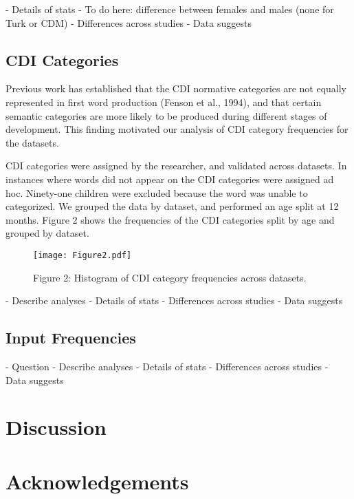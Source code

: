 \documentclass[10pt,letterpaper]{article}
\begin{document}
- Details of stats
- To do here: difference between females and males (none for Turk or CDM)
- Differences across studies
- Data suggests

\subsection{CDI Categories} 
Previous work has established that the CDI normative categories are not equally represented in first word production (Fenson et al., 1994), and that certain semantic categories are more likely to be produced during different stages of development. This finding motivated our analysis of CDI category frequencies for the datasets.\par
CDI categories were assigned by the researcher, and validated across datasets. In instances where words did not appear on the CDI categories were assigned ad hoc. Ninety-one children were excluded because the word was unable to categorized. We grouped the data by dataset, and performed an age split at 12 months. Figure 2 shows the frequencies of the CDI categories split by age and grouped by dataset.

\begin{figure}[t]
\begin{center}
\texttt{[image: Figure2.pdf]}
\end{center}
\caption{Figure 2: Histogram of CDI category frequencies across datasets.}
\end{figure}

- Describe analyses
- Details of stats
- Differences across studies
- Data suggests

\subsection{Input Frequencies}
- Question
- Describe analyses
- Details of stats
- Differences across studies
- Data suggests

\section{Discussion}

\section{Acknowledgements}
\end{document}
